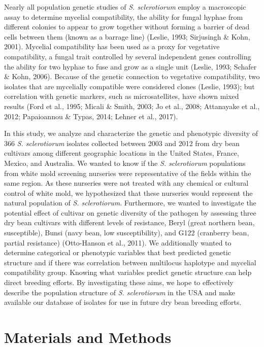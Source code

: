 \documentclass[fleqn,10pt,lineno]{wlpeerj} %
\theoremstyle{definition}
\theoremstyle{definition}
\theoremstyle{definition}
\theoremstyle{remark}
\begin{document}
Nearly all population genetic studies of \emph{S. sclerotiorum} employ a
macroscopic assay to determine mycelial compatibility, the ability for
fungal hyphae from different colonies to appear to grow together without
forming a barrier of dead cells between them (known as a barrage line)
(Leslie, 1993; Sirjusingh \& Kohn, 2001). Mycelial compatibility has
been used as a proxy for vegetative compatibility, a fungal trait
controlled by several independent genes controlling the ability for two
hyphae to fuse and grow as a single unit (Leslie, 1993; Schafer \& Kohn,
2006). Because of the genetic connection to vegetative compatibility,
two isolates that are mycelially compatible were considered clones
(Leslie, 1993); but correlation with genetic markers, such as
microsatellites, have shown mixed results (Ford et al., 1995; Micali \&
Smith, 2003; Jo et al., 2008; Attanayake et al., 2012; Papaioannou \&
Typas, 2014; Lehner et al., 2017).

In this study, we analyze and characterize the genetic and phenotypic
diversity of 366 \emph{S. sclerotiorum} isolates collected between 2003
and 2012 from dry bean cultivars among different geographic locations in
the United States, France, Mexico, and Australia. We wanted to know if
the \emph{S. sclerotiorum} populations from white mold screening
nurseries were representative of the fields within the same region. As
these nurseries were not treated with any chemical or cultural control
of white mold, we hypothesized that these nurseries would represent the
natural population of \emph{S. sclerotiorum}. Furthermore, we wanted to
investigate the potential effect of cultivar on genetic diversity of the
pathogen by assessing three dry bean cultivars with different levels of
resistance, Beryl (great northern bean, susceptible), Bunsi (navy bean,
low susceptibility), and G122 (cranberry bean, partial resistance)
(Otto-Hanson et al., 2011). We additionally wanted to determine
categorical or phenotypic variables that best predicted genetic
structure and if there was correlation between multilocus haplotype and
mycelial compatibility group. Knowing what variables predict genetic
structure can help direct breeding efforts. By investigating these aims,
we hope to effectively describe the population structure of \emph{S.
sclerotiorum} in the USA and make available our database of isolates for
use in future dry bean breeding efforts.

\section*{Materials and Methods}\label{materials-and-methods}
\end{document}
